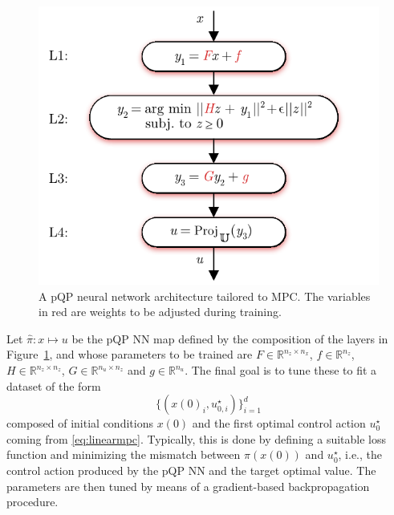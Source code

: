\begin{figure}[t!]
	\begin{center}
		\includegraphics[scale=0.8]{../images/chap4_nn_arch.pdf}  
		\caption{A pQP neural network architecture tailored to MPC. The variables in red are weights to be adjusted during training.}
		\label{fig:nnArchitecture}
	\end{center}
\end{figure}

Let $\hat\pi : x \mapsto u$ be the pQP NN map defined by the composition of the layers in Figure~\ref{fig:nnArchitecture}, and whose parameters to be trained are $F \in \mathbb{R}^{n_z \times n_x}$, $f \in \mathbb{R}^{n_z}$, $H \in \mathbb{R}^{n_z \times n_z}$, $G \in \mathbb{R}^{n_u \times n_z}$ and $g \in \mathbb{R}^{n_u}$. The final goal is to tune these to fit a dataset of the form 
\begin{equation}
	\{(x(0)_i, u_{0,i}^\star)\}_{i=1}^d
\end{equation}
composed of initial conditions $x(0)$ and the first optimal control action $u_0^\star$ coming from \eqref{eq:linearmpc}. Typically, this is done by defining a suitable loss function and minimizing the mismatch between $\hat\pi(x(0))$ and $u^\star_0$, i.e., the control action produced by the pQP NN and the target optimal value. The parameters are then tuned by means of a gradient-based  backpropagation procedure. 

